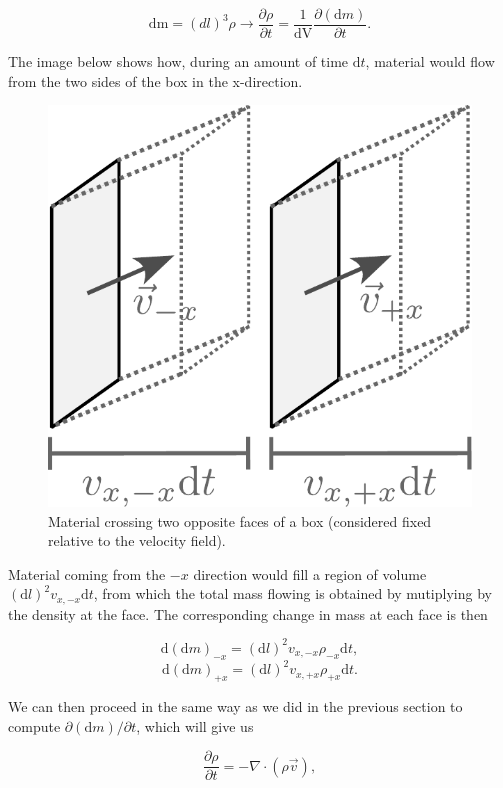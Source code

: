 \documentclass[twocolumn]{article}
\begin{document}
\[\mathrm{dm}=(dl)^3\rho \rightarrow \frac{\partial \rho}{\partial t}=\frac{1}{\mathrm{dV}}\frac{\partial(\mathrm{d}m)}{\partial t}.\]

The image below shows how, during an amount of time \(\mathrm{d}t\),
material would flow from the two sides of the box in the x-direction.

\begin{figure}
\centering
\includegraphics{../assets/2_equations/continuity.pdf}
\caption{Material crossing two opposite faces of a box (considered fixed
relative to the velocity field).}
\end{figure}

Material coming from the \(-x\) direction would fill a region of volume
\((\mathrm{d}l)^2v_{x,-x}\mathrm{d}t\), from which the total mass
flowing is obtained by mutiplying by the density at the face. The
corresponding change in mass at each face is then

\[\mathrm{d}(\mathrm{d}m)_{-x}=(\mathrm{d}l)^2 v_{x,-x}\rho_{-x}\mathrm{d}t,\]
\[\mathrm{d}(\mathrm{d}m)_{+x}=(\mathrm{d}l)^2 v_{x,+x}\rho_{+x}\mathrm{d}t.\]

We can then proceed in the same way as we did in the previous section to
compute \(\partial (\mathrm{d} m)/\partial t\), which will give us

\[\boxed{\frac{\partial \rho}{\partial t}=-\nabla \cdot (\rho \vec{v})},\]
\end{document}
